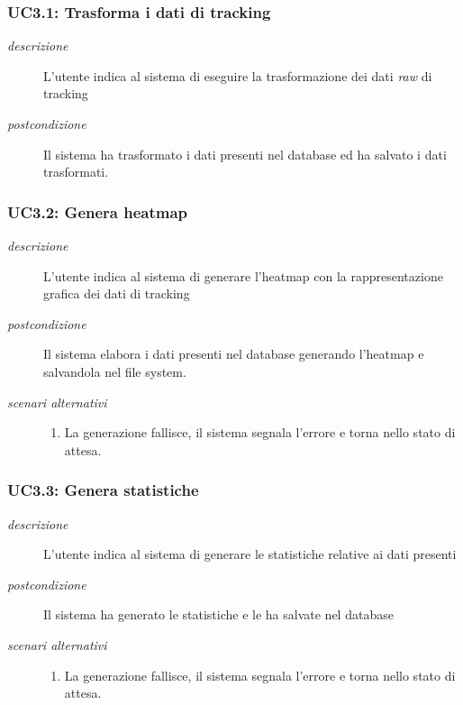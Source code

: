 \subsubsection{UC3.1: Trasforma i dati di tracking} \label{sec:uc3.1}
\begin{description}
 \item[\em{descrizione}] L'utente indica al sistema di eseguire la trasformazione dei dati \textit{raw} di tracking
  \item[\em{postcondizione}] Il sistema ha trasformato i dati presenti nel database ed ha salvato i dati trasformati.
  \end{description}
  
\subsubsection{UC3.2: Genera heatmap} \label{sec:uc3.2}
\begin{description}
 \item[\em{descrizione}] L'utente indica al sistema di generare l'heatmap con la rappresentazione grafica dei dati di tracking
  \item[\em{postcondizione}] Il sistema elabora i dati presenti nel database generando l'heatmap e salvandola nel file system.
  
\item[\em{scenari alternativi}] \mbox{}
  \begin{enumerate}
  \item La generazione fallisce, il sistema segnala l'errore e torna nello stato di attesa.
  \end{enumerate}  
  \end{description}
  
  
\subsubsection{UC3.3: Genera statistiche} \label{sec:uc3.3}
\begin{description}
 \item[\em{descrizione}] L'utente indica al sistema di generare le statistiche relative ai dati presenti
  \item[\em{postcondizione}] Il sistema ha generato le statistiche e le ha salvate nel database
  
\item[\em{scenari alternativi}] \mbox{}
  \begin{enumerate}
  \item La generazione fallisce, il sistema segnala l'errore e torna nello stato di attesa.
  \end{enumerate}  
  \end{description}  
  
